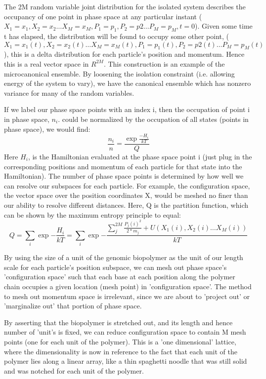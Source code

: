   The 2M random variable joint distribution for the isolated system describes the occupancy of one point in phase space at any particular instant ($X_1=x_1,X_2=x_2\dotsc X_M=x_M, P_1=p_1,P_2=p2\dotsc P_M= p_M,t=0$).  Given some time t has elapsed, the distribution will be found to occupy some other point, ($X_1=x_1(t),X_2=x_2(t)\dotsc X_M=x_M(t), P_1=p_1(t),P_2=p2(t)\dotsc P_M=p_M(t)$), this is a delta distribution for each particle's position and momentum\cite{vankampen}.  Hence this is a real vector space in $R^{2M}$.
     This construction is an example of the microcanonical ensemble.  By loosening the isolation constraint (i.e. allowing energy of the system to vary), we have the canonical ensemble which has nonzero variance for many of the random variables.

 If we label our phase space points with an index i, then the occupation of point i in phase space, $n_i$. could be normalized by the occupation of all states (points in phase space), we would find:
    \begin{equation}\label{}
   \frac{ n_i}{n} =\frac{ \exp\frac{-H_i}{kT} }{ Q }
  \end{equation}
  Here $H_i$, is the Hamiltonian evaluated at the phase space point i (just plug in the corresponding positions and momentum of each particle for that state into the Hamiltonian).  The number of phase space points is determined by how well we can resolve our subspaces for each particle.  For example, the configuration space, the vector space over the position coordinates X, would be meshed no finer than our ability to resolve different distances.  Here, Q is the partition function, which can be shown by the maximum entropy principle to equal:
  \begin{equation}\label{}
     Q= \sum_i \exp{-\frac{H_i}{kT}} = \sum_i \exp{-\frac{ \sum_j^{2M} \frac{P_j(i)^2}{2*m_j} + U(X_1(i), X_2(i)\dotsc X_M(i))}{kT} }
  \end{equation}

By using the size of a unit of the genomic biopolymer as the unit of our length scale for each particle's position subspace, we can mesh out phase space's 'configuration space' such that each base at each position along the polymer chain occupies a given location (mesh point) in 'configuration space'.  The method to mesh out momentum space is irrelevant, since we are about to 'project out' or 'marginalize out' that portion of phase space.  

By asserting that the biopolymer is stretched out, and its length and hence number of 'unit's is fixed, we can reduce configuration space to contain M mesh points (one for each unit of the polymer).  This is a 'one dimensional' lattice, where the dimensionality is now in reference to the fact that each unit of the polymer lies along a linear array, like a thin spaghetti noodle that was still solid and was notched for each unit of the polymer.

